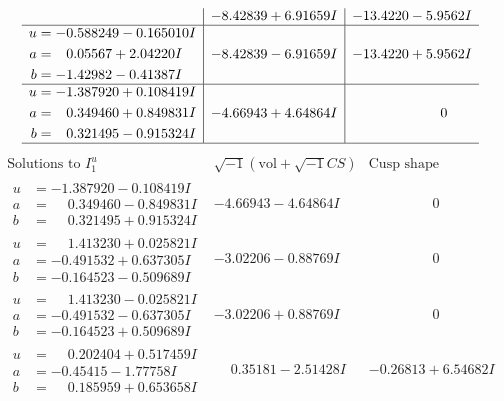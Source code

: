 \documentclass[1p]{elsarticle_modified}
\theoremstyle{definition}
\newcommand{\I}{\sqrt{-1}}
\begin{document}
$$\begin{array}{c|c|c}
 & -8.42839 + 6.91659 I & -13.4220 - 5.9562 I \\ \hline\begin{aligned}
u &= -0.588249 - 0.165010 I \\
a &= \phantom{-}0.05567 + 2.04220 I \\
b &= -1.42982 - 0.41387 I\end{aligned}
 & -8.42839 - 6.91659 I & -13.4220 + 5.9562 I \\ \hline\begin{aligned}
u &= -1.387920 + 0.108419 I \\
a &= \phantom{-}0.349460 + 0.849831 I \\
b &= \phantom{-}0.321495 - 0.915324 I\end{aligned}
 & -4.66943 + 4.64864 I & \phantom{-0.000000 } 0\\
 \hline 
 \end{array}$$\newpage$$\begin{array}{c|c|c}  
\text{Solutions to }I^u_{1}& \I (\text{vol} + \sqrt{-1}CS) & \text{Cusp shape}\\
 \hline 
\begin{aligned}
u &= -1.387920 - 0.108419 I \\
a &= \phantom{-}0.349460 - 0.849831 I \\
b &= \phantom{-}0.321495 + 0.915324 I\end{aligned}
 & -4.66943 - 4.64864 I & \phantom{-0.000000 } 0 \\ \hline\begin{aligned}
u &= \phantom{-}1.413230 + 0.025821 I \\
a &= -0.491532 + 0.637305 I \\
b &= -0.164523 - 0.509689 I\end{aligned}
 & -3.02206 - 0.88769 I & \phantom{-0.000000 } 0 \\ \hline\begin{aligned}
u &= \phantom{-}1.413230 - 0.025821 I \\
a &= -0.491532 - 0.637305 I \\
b &= -0.164523 + 0.509689 I\end{aligned}
 & -3.02206 + 0.88769 I & \phantom{-0.000000 } 0 \\ \hline\begin{aligned}
u &= \phantom{-}0.202404 + 0.517459 I \\
a &= -0.45415 - 1.77758 I \\
b &= \phantom{-}0.185959 + 0.653658 I\end{aligned}
 & \phantom{-}0.35181 - 2.51428 I & -0.26813 + 6.54682 I \\ \hline\begin{aligned}

\end{aligned}
\end{array}$$
\end{document}
